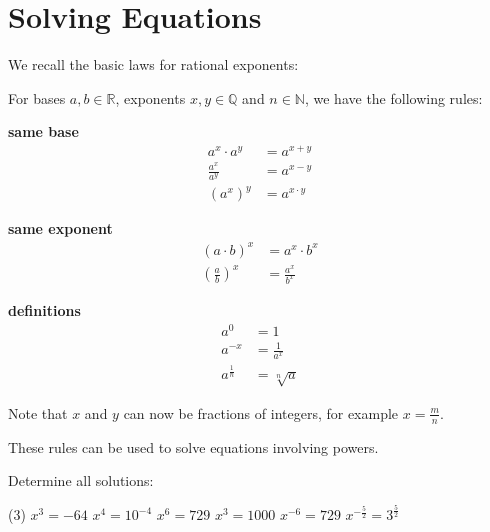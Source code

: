 \section*{Solving Equations}
We recall the basic laws for rational exponents:
\begin{tcolorbox}
	For bases $a,b\in\mathbb R$, exponents $x,y\in\mathbb Q$ and $n\in\mathbb N$, we have the following rules:
	\begin{multicols}{3}
		\centering
		\textbf{same base}\\
		\begin{align*}
			a^x\cdot a^y&=a^{x+y} \\[8pt]
			\frac{a^x}{a^y}&=a^{x-y} \\[8pt]
			\left(a^x\right)^y&=a^{x\cdot y}
		\end{align*}
		\vfill
		\columnbreak
		
		\textbf{same exponent}\\
		\begin{align*}
			\left(a\cdot b\right)^x&=a^x\cdot b^x \\[8pt]
			\left(\frac{a}{b}\right)^x&=\frac{a^x}{b^x}
		\end{align*}
		\vfill
		\columnbreak
		
		\textbf{definitions}\\
		\begin{align*}
			a^0&=1 \\[8pt]
			a^{-x}&=\frac{1}{a^x} \\[8pt]
			a^{\frac{1}{n}}&=\sqrt[n]{a}
		\end{align*}
		\vfill
	\end{multicols}
	Note that $x$ and $y$ can now be fractions of integers, for example $x=\frac{m}{n}$.
\end{tcolorbox}
These rules can be used to solve equations involving powers.
\begin{exercise}
	Determine all solutions:
	\begin{tasks}(3)
		\task $x^3=-64$
		\task $x^4=10^{-4}$
		\task $x^6=729$
		\task $x^3=1000$
		\task $x^{-6}=729$
		\task $x^{-\frac{5}{2}}=3^{\frac{5}{2}}$
	\end{tasks}
\end{exercise}
